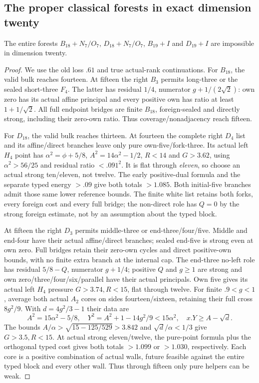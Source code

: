 \subsection{The proper classical forests in exact dimension twenty}
\label{app:tail:proper20classical}
\begin{lemma}
\label{app:tail:lem:proper20classical}
The entire forests $B_{18}+N_7/O_7$, $D_{18}+N_7/O_7$,
$B_{19}+I$ and $D_{19}+I$ are impossible in dimension twenty.
\end{lemma}
\begin{proof}
We use the old loss $.61$ and true actual-rank continuations.
For $B_{18}$, the valid bulk reaches fourteen. At fifteen the
right $B_3$ permits long-three or the sealed short-three $F_4$.
The latter has residual $1/4$, numerator $g+1/(2\sqrt2)$:
own zero has its actual affine principal and every positive own
has ratio at least $1+1/\sqrt2$. All full endpoint bridges are
finite $B_{18}$, foreign-sealed and directly strong, including
their zero-own ratio. Thus coverage/nonadjacency reach fifteen.

For $D_{18}$, the valid bulk reaches thirteen. At fourteen the
complete right $D_4$ list and its affine/direct branches leave
only pure own-five/fork-three. Its actual left $H_4$ point has
$\alpha^2=\phi+5/8$, $A^2=14\alpha^2-1/2$, $R<14$ and
$G>3.62$, using $\alpha^2>56/25$ and residual ratio $<.091^2$.
It is flat through \emph{eleven}, so choose an actual strong
ten/eleven, not twelve. The early positive-dual formula and the
separate typed energy $>.09$ give both totals $>1.085$.
Both initial-five branches admit those same lower reference bounds.
The finite white list retains both forks, every foreign cost and
every full bridge; the non-direct role has $Q=0$ by the strong
foreign estimate, not by an assumption about the typed block.

At fifteen the right $D_3$ permits middle-three or end-three/four/five.
Middle and end-four have their actual affine/direct branches;
sealed end-five is strong even at own zero. Full bridges retain
their zero-own cycles and direct positive-own bounds, with no
finite extra branch at the internal cap. The end-three no-left
role has residual $5/8-Q$, numerator $g+1/4$; positive $Q$ and
$g\ge1$ are strong and own zero/three/four/six/parallel have
their actual principals. Own five gives its actual left $H_4$
pressure $G>3.74,R<15$, flat through twelve.
For finite $.9<g<1$, average both actual $A_2$ cores on sides
fourteen/sixteen, retaining their full cross $8g^2/9$.
With $d=4g^2/3-1$ their data are
\[
 A^2=15\alpha^2-5/8,\quad
 Y^2=A^2+1-14g^2/9<15\alpha^2,\quad
 x.Y\ge A-\sqrt d.
\]
The bounds $A/\alpha>\sqrt{15-125/529}>3.842$ and
$\sqrt d/\alpha<1/3$ give $G>3.5,R<15$.
At actual strong eleven/twelve, the pure-point formula plus the
orthogonal typed cost gives both totals $>1.099$ or $>1.030$,
respectively. Each core is a positive combination of actual walls,
future feasible against the entire typed block and every other wall.
Thus through fifteen only pure helpers can be weak.


\end{proof}
